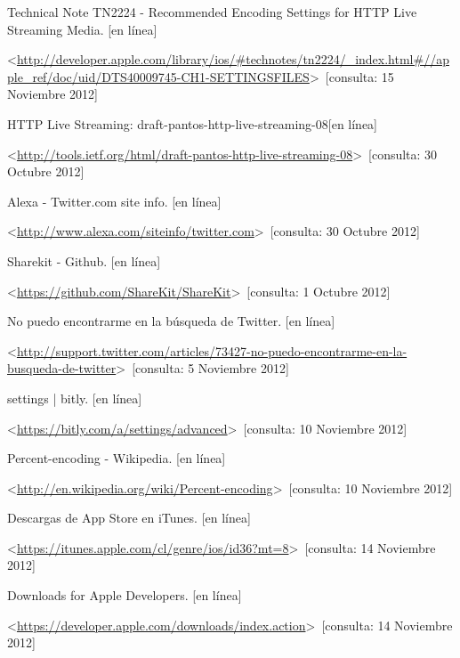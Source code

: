
\begin{thebibliography}{99}
\begin{sloppypar}

Technical Note TN2224 - Recommended Encoding Settings for HTTP Live Streaming Media. [en línea]\

\textless \url{http://developer.apple.com/library/ios/#technotes/tn2224/_index.html#//apple_ref/doc/uid/DTS40009745-CH1-SETTINGSFILES}\textgreater \ [consulta: 15 Noviembre 2012]

HTTP Live Streaming: draft-pantos-http-live-streaming-08[en línea]\

\textless \url{http://tools.ietf.org/html/draft-pantos-http-live-streaming-08}\textgreater \ [consulta: 30 Octubre 2012]

Alexa - Twitter.com site info. [en línea]\

\textless \url{http://www.alexa.com/siteinfo/twitter.com}\textgreater \ [consulta: 30 Octubre 2012] 

Sharekit - Github. [en línea]\

\textless \url{https://github.com/ShareKit/ShareKit}\textgreater \ [consulta: 1 Octubre 2012] 


No puedo encontrarme en la búsqueda de Twitter. [en línea]

\textless \url{http://support.twitter.com/articles/73427-no-puedo-encontrarme-en-la-busqueda-de-twitter}\textgreater \ [consulta: 5 Noviembre 2012] 

settings | bitly. [en línea]\

\textless \url{https://bitly.com/a/settings/advanced}\textgreater \ [consulta: 10 Noviembre 2012] 

Percent-encoding - Wikipedia. [en línea]\

\textless \url{http://en.wikipedia.org/wiki/Percent-encoding}\textgreater \ [consulta: 10 Noviembre 2012] 


Descargas de App Store en iTunes. [en línea]\

\textless \url{https://itunes.apple.com/cl/genre/ios/id36?mt=8}\textgreater \ [consulta: 14 Noviembre 2012] 

Downloads for Apple Developers. [en línea]\

\textless \url{https://developer.apple.com/downloads/index.action}\textgreater \ [consulta: 14 Noviembre 2012]


\end{sloppypar}
\end{thebibliography}
